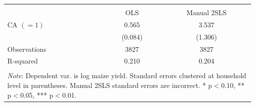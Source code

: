 \begin{tabular}{l*{2}{c}} 
\\[-1.8ex]\hline \hline \\[-1.8ex] 
& \multicolumn{1}{c}{OLS} & 
\multicolumn{1}{c}{Manual 2SLS} 
\\ \midrule
\midrule
\hspace{0.1cm} CA $(=1)$&       0.565\sym{***}&       3.537\sym{***}\\
                    &     (0.084)         &     (1.306)         \\
\midrule
Observations        &        3827         &        3827         \\
R-squared           &       0.210         &       0.204         \\
\hline \hline \\[-1.8ex] 
\multicolumn{3}{p{\linewidth}}{\small 
\noindent \textit{Note}: Dependent var. 
is log maize yield. Standard errors 
clustered at household level in 
parentheses. Manual 2SLS standard errors 
are incorrect. 
* p$<$0.10, ** p$<$0.05, *** p$<$0.01.} 
\end{tabular}
